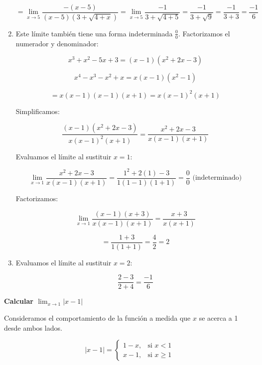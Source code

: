 \documentclass[answers]{exam} %
\begin{document}
\begin{questions}
\begin{solution}
\begin{enumerate}[label=\alph*.]
			      \[
				      = \lim_{x\to{5}} \frac{-(x-5)}{(x-5)(3+\sqrt{4+x})} = \lim_{x\to{5}} \frac{-1}{3+\sqrt{4+5}} = \frac{-1}{3+\sqrt{9}} = \frac{-1}{3+3} = \frac{-1}{6}
			      \]
			      \vspace{1cm}

			\item Este límite también tiene una forma indeterminada \( \frac{0}{0} \). Factorizamos el numerador y denominador:

			      \[
				      x^3 + x^2 - 5x + 3 = (x-1)(x^2 + 2x - 3)
			      \]

			      \[
				      x^4 - x^3 - x^2 + x = x(x-1)(x^2 - 1)
			      \]

			      \[
				      = x(x-1)(x-1)(x+1) = x(x-1)^2(x+1)
			      \]

			      Simplificamos:

			      \[
				      \frac{(x-1)(x^2 + 2x - 3)}{x(x-1)^2(x+1)} = \frac{x^2 + 2x - 3}{x(x-1)(x+1)}
			      \]

			      Evaluamos el límite al sustituir \(x = 1\):

			      \[
				      \lim_{x\to{1}} \frac{x^2 + 2x - 3}{x(x-1)(x+1)} = \frac{1^2 + 2(1) - 3}{1(1-1)(1+1)} = \frac{0}{0} \text{ (indeterminado)}
			      \]

			      Factorizamos:

			      \[
				      \lim_{x\to{1}} \frac{(x-1)(x+3)}{x(x-1)(x+1)} = \frac{x+3}{x(x+1)}
			      \]

			      \[
				      = \frac{1+3}{1(1+1)} = \frac{4}{2} = 2
			      \]

			\item Evaluamos el límite al sustituir \(x = 2\):

			      \[
				      \frac{2-3}{2+4} = \frac{-1}{6}
			      \]
		\end{enumerate}
		\vspace{1cm}
	\end{solution}


	\vspace{0.5cm}

	\question \large\textbf{Calcular $\displaystyle \lim_{x\to{1}} |x-1|$}
	\begin{solution}
		Consideramos el comportamiento de la función a medida que \( x \) se acerca a 1 desde ambos lados.

		\[
			|x-1| =
			\begin{cases}
				1 - x, & \text{si } x < 1   \\
				x - 1, & \text{si } x \ge 1
			\end{cases}
		\]


\end{solution}
\end{questions}
\end{document}

